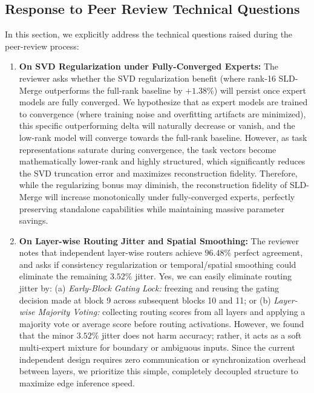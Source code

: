\documentclass{article}
\theoremstyle{plain}
\theoremstyle{definition}
\theoremstyle{remark}
\begin{document}
\subsection{Response to Peer Review Technical Questions}
\label{sec:appendix_peer_review}
In this section, we explicitly address the technical questions raised during the peer-review process:
\begin{enumerate}
    \item \textbf{On SVD Regularization under Fully-Converged Experts:} The reviewer asks whether the SVD regularization benefit (where rank-16 SLD-Merge outperforms the full-rank baseline by $+1.38\%$) will persist once expert models are fully converged. We hypothesize that as expert models are trained to convergence (where training noise and overfitting artifacts are minimized), this specific outperforming delta will naturally decrease or vanish, and the low-rank model will converge towards the full-rank baseline. However, as task representations saturate during convergence, the task vectors become mathematically lower-rank and highly structured, which significantly reduces the SVD truncation error and maximizes reconstruction fidelity. Therefore, while the regularizing bonus may diminish, the reconstruction fidelity of SLD-Merge will increase monotonically under fully-converged experts, perfectly preserving standalone capabilities while maintaining massive parameter savings.
    \item \textbf{On Layer-wise Routing Jitter and Spatial Smoothing:} The reviewer notes that independent layer-wise routers achieve $96.48\%$ perfect agreement, and asks if consistency regularization or temporal/spatial smoothing could eliminate the remaining $3.52\%$ jitter. Yes, we can easily eliminate routing jitter by: (a) \emph{Early-Block Gating Lock:} freezing and reusing the gating decision made at block 9 across subsequent blocks 10 and 11; or (b) \emph{Layer-wise Majority Voting:} collecting routing scores from all layers and applying a majority vote or average score before routing activations. However, we found that the minor $3.52\%$ jitter does not harm accuracy; rather, it acts as a soft multi-expert mixture for boundary or ambiguous inputs. Since the current independent design requires zero communication or synchronization overhead between layers, we prioritize this simple, completely decoupled structure to maximize edge inference speed.
\end{enumerate}
\end{document}
